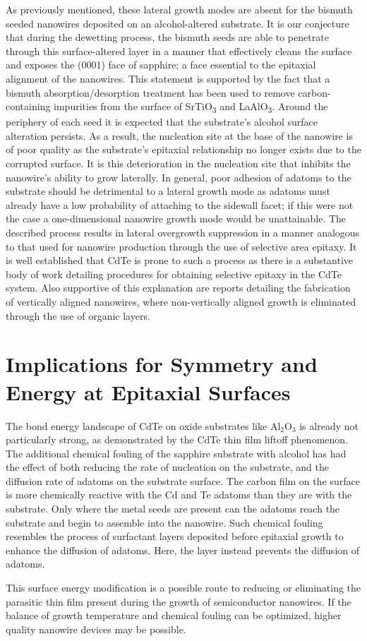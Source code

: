 As previously mentioned, these lateral growth modes are absent for the bismuth seeded nanowires deposited on an alcohol-altered substrate.
It is our conjecture that during the dewetting process, the bismuth seeds are able to penetrate through this surface-altered layer in a manner that effectively cleans the surface and exposes the (0001) face of sapphire; a face essential to the epitaxial alignment of the nanowires.
This statement is supported by the fact that a bismuth absorption/desorption treatment has been used to remove carbon-containing impurities from the surface of SrTiO\textsubscript{3} and LaAlO\textsubscript{3}\cite{Watanabe1991a}.
Around the periphery of each seed it is expected that the substrate's alcohol surface alteration persists.
As a result, the nucleation site at the base of the nanowire is of poor quality as the substrate's epitaxial relationship no longer exists due to the corrupted surface.
It is this deterioration in the nucleation site that inhibits the nanowire's ability to grow laterally.
In general, poor adhesion of adatoms to the substrate should be detrimental to a lateral growth mode as adatoms must already have a low probability of attaching to the sidewall facet; if this were not the case a one-dimensional nanowire growth mode would be unattainable.
The described process results in lateral overgrowth suppression in a manner analogous to that used for nanowire production through the use of selective area epitaxy.
It is well established that CdTe is prone to such a process as there is a substantive body of work detailing procedures for obtaining selective epitaxy in the CdTe system\cite{Sporken2000,Zhang2001a,Bhat2006a}.
Also supportive of this explanation are reports detailing the fabrication of vertically aligned nanowires, where non-vertically aligned growth is eliminated through the use of organic layers\cite{Krishnamachari2004,Mikkelsen2005,Martensson2007}.

\section{Implications for Symmetry and Energy at Epitaxial Surfaces}
The bond energy landscape of CdTe on oxide substrates like Al\(_2\)O\(_3\) is already not particularly strong, as demonstrated by the CdTe thin film liftoff phenomenon.
The additional chemical fouling of the sapphire substrate with alcohol has had the effect of both reducing the rate of nucleation on the substrate, and the diffusion rate of adatoms on the substrate surface.
The carbon film on the surface is more chemically reactive with the Cd and Te adatoms than they are with the substrate.
Only where the metal seeds are present can the adatoms reach the substrate and begin to assemble into the nanowire.
Such chemical fouling resembles the process of surfactant layers deposited before epitaxial growth to enhance the diffusion of adatoms\cite{PhysRevLett.63.632}.
Here, the layer instead prevents the diffusion of adatoms.

This surface energy modification is a possible route to reducing or eliminating the parasitic thin film present during the growth of semiconductor nanowires.
If the balance of growth temperature and chemical fouling can be optimized, higher quality nanowire devices may be possible.
